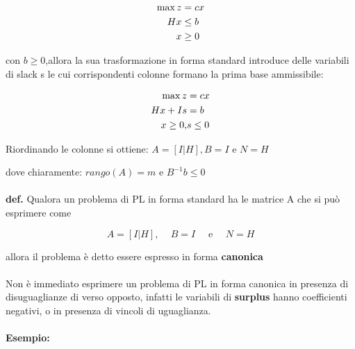 \documentclass[a4paper, 11pt]{article}
\begin{document}
        \begin{align}
            \max{z} &= cx \notag \\
            Hx &\leq b \notag \\
            x &\geq 0 \notag 
        \end{align}

        con $b \geq 0$,allora la sua trasformazione in forma standard introduce delle variabili di slack s le cui corrispondenti colonne formano la prima base ammissibile: 

        \begin{align}
            \max{z} &= cx \notag \\
            Hx + Is & = b \notag \\
            x \geq 0, &s \leq 0 \notag 
        \end{align}

        Riordinando le colonne si ottiene: $A = [I | H], B = I$ e $N = H$

        dove chiaramente: $rango(A) = m$ e $B^{-1}b \le 0$

        \paragraph{}
        \textbf{def. }  Qualora un problema di PL in forma standard ha le matrice A che si può esprimere come

        $$
            A = [I | H] \text{, } \quad B = I \quad \text{ e }\quad N = H
        $$

        allora il problema è detto essere espresso in forma \textbf{canonica}

        \paragraph{}
        Non è immediato esprimere un problema di PL in forma canonica in presenza di disuguaglianze di verso opposto, infatti le variabili di \textbf{surplus} hanno coefficienti negativi, o in presenza di vincoli di uguaglianza.


        \paragraph{}
        \textbf{Esempio: }
\end{document}
